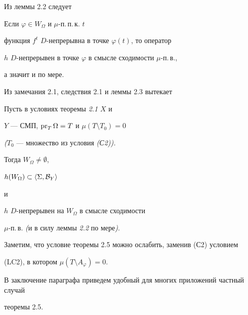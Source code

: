 Из леммы 2.2 следует





\begin{lems} Если $\varphi\in W_\Omega$ и $\mu$-п.\,п.\,к. $t$


функция $f^t$ \; $D$-непрерывна в точке $\varphi(t)$, то оператор


$h$\; $D$-непрерывен в точке $\varphi$ в смысле сходимости $\mu$-п.\,в.,


а значит и по мере.


\end{lems}





Из замечания 2.1, следствия 2.1 и леммы 2.3 вытекает





\begin{thms} Пусть в условиях теоремы {\em 2.1} $X$ и


$Y$ --- СМП, $\operatorname{pr}_T\Omega=T$ и $\mu(T\setminus T_0)=0$


{\em (}$T_0$ --- множество из условия {\em (С2)).}


Тогда $W_\Omega\ne\emptyset$,


$h(W_\Omega)\subset\langle \Sigma ,{\cal B}_Y\rangle $


и


$h$ \; $D$-непрерывен на $W_\Omega$ в смысле сходимости


$\mu$-п.\,в. {\em (}и в силу леммы {\em 2.2} по мере{\em )}.


\end{thms}





Заметим, что условие теоремы 2.5 можно ослабить, заменив (С2) условием


(LC2), в котором $\mu(T\setminus A_\varphi)=0$.





В заключение параграфа приведем удобный для многих приложений частный случай


теоремы 2.5.





